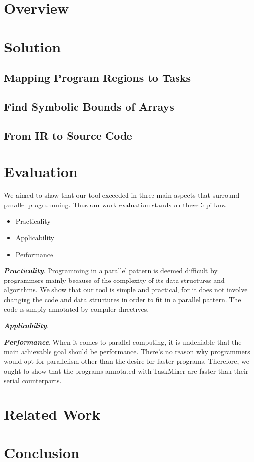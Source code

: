 \documentclass[sigplan,10pt,review,anonymous]{acmart}
\begin{document}
\section{Overview}
\label{sec:ovf}

\section{Solution}
\label{sec:sol}

\subsection{Mapping Program Regions to Tasks}
\label{sub:region}

\subsection{Find Symbolic Bounds of Arrays}
\label{sub:symb}

\subsection{From IR to Source Code}
\label{sub:ir}

\section{Evaluation}
\label{sec:eval}

We aimed to show that our tool exceeded in three main aspects that surround parallel programming. Thus our work evaluation stands on these 3 pillars:

\begin{itemize}

\item Practicality
\item Applicability
\item Performance

\end{itemize}

\textbf{\textit{Practicality}}. Programming in a parallel pattern is deemed difficult by programmers mainly because of the complexity of its data structures and algorithms. We show that our tool is simple and practical, for it does not involve changing the code and data structures in order to fit in a parallel pattern. The code is simply annotated by compiler directives.

\textbf{\textit{Applicability}}. 

\textbf{\textit{Performance}}. When it comes to parallel computing, it is undeniable that the main achievable goal should be performance. There's no reason why programmers would opt for parallelism other than the desire for faster programs. Therefore, we ought to show that the programs annotated with TaskMiner are faster than their serial counterparts. 

\section{Related Work}
\label{sec:rw}

\section{Conclusion}
\label{sec:conc}


\end{document}
